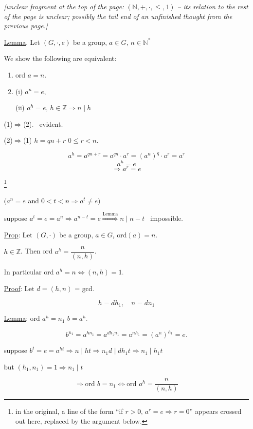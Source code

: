 \documentclass[12pt]{article}
\begin{document}
\noindent\textit{[unclear fragment at the top of the page: $(\mathbb{N},+,\cdot,\leq,1)$ -- its relation to the rest of the page is unclear; possibly the tail end of an unfinished thought from the previous page.]}

\bigskip
\noindent\underline{Lemma}. Let $(G,\cdot,e)$ be a group, $a\in G$, $n\in\mathbb{N}^*$

\noindent We show the following are equivalent:

\begin{enumerate}
\item[(1)] ord $a=n$.
\item[(2)] (i) $a^n=e$,

\noindent (ii) $a^h=e$, $h\in\mathbb{Z} \Rightarrow n\mid h$
\end{enumerate}

\bigskip
\noindent (1)$\Rightarrow$(2). \ evident.

\bigskip
\noindent (2)$\Rightarrow$(1) \quad $h=qn+r$ \quad $0\leq r<n$.

\[
a^h = a^{qn+r} = a^{qn}\cdot a^r = (a^n)^q\cdot a^r = a^r
\]
\[
a^h=e
\]
\[
\Rightarrow a^r=e
\]

\noindent\footnote{in the original, a line of the form ``if $r>0$, $a^r=e\Rightarrow r=0$'' appears crossed out here, replaced by the argument below.}

\bigskip
\begin{center}
$\big(a^n=e$ and $0<t<n \Rightarrow a^t\neq e\big)$
\end{center}

\noindent suppose $a^t=e=a^n \Rightarrow a^{n-t}=e \overset{\text{Lemma}}{\Longrightarrow} n\mid n-t$ \ impossible.

\begin{center}
\end{center}

\bigskip
\noindent\underline{Prop}: Let $(G,\cdot)$ be a group, $a\in G$, ord$(a)=n$.

\noindent $h\in\mathbb{Z}$. Then ord $a^h = \dfrac{n}{(n,h)}$.

\bigskip
\noindent In particular ord $a^h=n \Leftrightarrow (n,h)=1$.

\bigskip
\noindent\underline{Proof}: Let $d=(h,n)$ = gcd.

\[
h=dh_1, \quad n=dn_1
\]

\noindent\underline{Lemma}: ord $a^h = n_1$ \qquad $b=a^h$.

\[
b^{n_1} = a^{hn_1} = a^{dh_1n_1} = a^{nh_1} = (a^n)^{h_1} = e.
\]

\noindent suppose $b^t=e=a^{ht} \Rightarrow n\mid ht \Rightarrow n_1d\mid dh_1t \Rightarrow n_1\mid h_1t$

\noindent but $(h_1,n_1)=1 \Rightarrow n_1\mid t$

\[
\Rightarrow \text{ord } b=n_1 \Leftrightarrow \text{ord } a^h = \frac{n}{(n,h)}
\]
\end{document}
